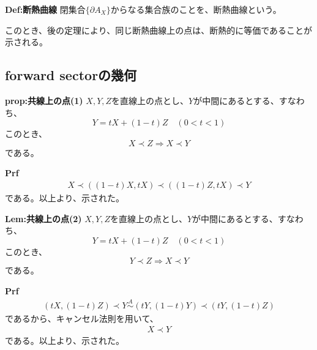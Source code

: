 \documentclass[a4paper,11pt]{jsarticle}
\begin{document}
\begin{itembox}[l]{\textbf{Def:断熱曲線}}
    閉集合$\{\partial A_X\}$からなる集合族のことを、断熱曲線という。
\end{itembox}
このとき、後の定理により、同じ断熱曲線上の点は、断熱的に等価であることが示される。

\subsection{forward sectorの幾何}
\begin{itembox}[l]{\textbf{prop:共線上の点(1)}}
$X,Y,Z$を直線上の点とし、$Y$が中間にあるとする、すなわち、
\begin{equation}
    Y=tX+(1-t)Z \quad (0<t<1)
\end{equation}
このとき、
\begin{equation}
    X \prec Z \Rightarrow X \prec Y
\end{equation}
である。
\end{itembox}
\textbf{Prf}\\
\begin{align}
    X \prec ((1-t)X,tX) \prec ((1-t)Z,tX) \prec Y
\end{align}
である。以上より、示された。\hfill\qedsymbol\\

\begin{itembox}[l]{\textbf{Lem:共線上の点(2)}}
$X,Y,Z$を直線上の点とし、$Y$が中間にあるとする、すなわち、
\begin{equation}
    Y=tX+(1-t)Z \quad (0<t<1)
\end{equation}
このとき、
\begin{equation}
    Y \prec Z \Rightarrow X \prec Y
\end{equation}
である。
\end{itembox}
\textbf{Prf}\\
\begin{align}
    (tX,(1-t)Z) \prec Y \overset{A}{\sim} (tY,(1-t)Y)\prec (tY,(1-t)Z)
\end{align}
であるから、キャンセル法則を用いて、
\begin{align}
    X \prec Y
\end{align}
である。以上より、示された。\hfill\qedsymbol\\
\end{document}
